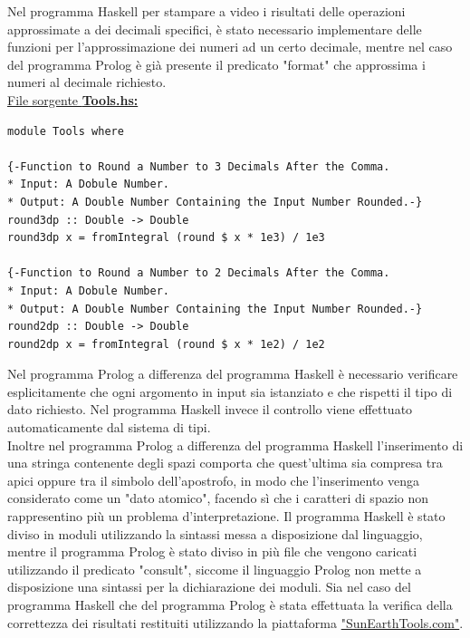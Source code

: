 \documentclass{article}
\begin{document}
Nel programma Haskell per stampare a video i risultati delle operazioni approssimate a dei decimali specifici, è stato necessario implementare delle funzioni per l'approssimazione dei numeri ad un certo decimale, mentre nel caso del programma Prolog è già presente il predicato "format" che approssima i numeri al decimale richiesto.\\
\bigskip
\underline{File sorgente \textbf{Tools.hs:}}
\lstset{language=Haskell}
\begin{lstlisting}
module Tools where

{-Function to Round a Number to 3 Decimals After the Comma.
* Input: A Dobule Number.
* Output: A Double Number Containing the Input Number Rounded.-}
round3dp :: Double -> Double
round3dp x = fromIntegral (round $ x * 1e3) / 1e3

{-Function to Round a Number to 2 Decimals After the Comma.
* Input: A Dobule Number.
* Output: A Double Number Containing the Input Number Rounded.-}
round2dp :: Double -> Double
round2dp x = fromIntegral (round $ x * 1e2) / 1e2
\end{lstlisting}

Nel programma Prolog a differenza del programma Haskell è necessario verificare esplicitamente che ogni argomento in input sia istanziato e che rispetti il tipo di dato richiesto. Nel programma Haskell invece il controllo viene effettuato automaticamente dal sistema di tipi.\\
Inoltre nel programma Prolog a differenza del programma Haskell l'inserimento di una stringa contenente degli spazi comporta che quest'ultima sia compresa tra apici oppure tra il simbolo dell'apostrofo, in modo che l'inserimento venga considerato come un "dato atomico",  facendo sì che i caratteri di spazio non rappresentino più un problema d'interpretazione.
Il programma Haskell è stato diviso in moduli utilizzando la sintassi messa a disposizione dal linguaggio, mentre il programma Prolog è stato diviso in più file che vengono caricati utilizzando il predicato "consult", siccome il linguaggio Prolog non mette a disposizione una sintassi per la dichiarazione dei moduli.
Sia nel caso del programma Haskell che del programma Prolog è stata effettuata la verifica della correttezza dei risultati restituiti utilizzando la piattaforma \href{https://www.sunearthtools.com/it/tools/distance.php}{"SunEarthTools.com"}.
\end{document}
